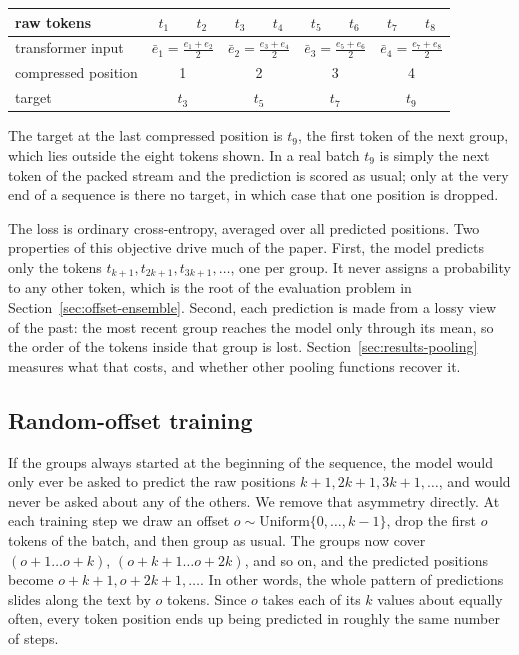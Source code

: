 \documentclass[11pt]{article}
\begin{document}
\begin{center}
\begin{tabular}{lcccccccc}
\toprule
raw tokens & $t_1$ & $t_2$ & $t_3$ & $t_4$ & $t_5$ & $t_6$ & $t_7$ & $t_8$ \\
\midrule
transformer input & \multicolumn{2}{c}{$\bar e_1 = \tfrac{e_1+e_2}{2}$}
               & \multicolumn{2}{c}{$\bar e_2 = \tfrac{e_3+e_4}{2}$}
               & \multicolumn{2}{c}{$\bar e_3 = \tfrac{e_5+e_6}{2}$}
               & \multicolumn{2}{c}{$\bar e_4 = \tfrac{e_7+e_8}{2}$} \\
\midrule
compressed position & \multicolumn{2}{c}{1} & \multicolumn{2}{c}{2}
       & \multicolumn{2}{c}{3} & \multicolumn{2}{c}{4} \\
\midrule
target & \multicolumn{2}{c}{$t_3$}
       & \multicolumn{2}{c}{$t_5$}
       & \multicolumn{2}{c}{$t_7$}
       & \multicolumn{2}{c}{$t_9$} \\
\bottomrule
\end{tabular}
\end{center}

The target at the last compressed position is $t_9$, the first token of the
next group, which lies outside the eight tokens shown. In a real batch $t_9$
is simply the next token of the packed stream and the prediction is scored as
usual; only at the very end of a sequence is there no target, in which case
that one position is dropped.

The loss is ordinary cross-entropy, averaged over all predicted positions.
Two properties of this objective drive much of the paper. First, the model
predicts only the tokens $t_{k+1}, t_{2k+1}, t_{3k+1}, \dots$, one per group.
It never assigns a probability to any other token, which is the root of the
evaluation problem in Section~\ref{sec:offset-ensemble}. Second, each
prediction is made from a lossy view of the past: the most recent group
reaches the model only through its mean, so the order of the tokens inside
that group is lost. Section~\ref{sec:results-pooling} measures what that
costs, and whether other pooling functions recover it.

\subsection{Random-offset training}
\label{sec:method-random-offset}

If the groups always started at the beginning of the sequence, the model
would only ever be asked to predict the raw positions $k{+}1, 2k{+}1,
3k{+}1, \dots$, and would never be asked about any of the others. We remove
that asymmetry directly. At each training step we draw an offset $o \sim
\mathrm{Uniform}\{0, \dots, k{-}1\}$, drop the first $o$ tokens of the batch,
and then group as usual. The groups now cover $(o{+}1 \dots o{+}k)$,
$(o{+}k{+}1 \dots o{+}2k)$, and so on, and the predicted positions become
$o{+}k{+}1, o{+}2k{+}1, \dots$. In other words, the whole pattern of
predictions slides along the text by $o$ tokens. Since $o$ takes each of its
$k$ values about equally often, every token position ends up being predicted
in roughly the same number of steps.
\end{document}
